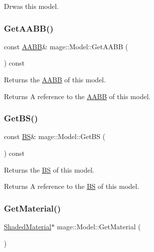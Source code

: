 Drwas this model. \hypertarget{classmage_1_1_model_a07af22d1e72ffde3ad33b709a8d5c7f4}{}\label{classmage_1_1_model_a07af22d1e72ffde3ad33b709a8d5c7f4} 
\subsubsection{\texorpdfstring{Get\+A\+A\+B\+B()}{GetAABB()}}
{\footnotesize\ttfamily const \hyperlink{structmage_1_1_a_a_b_b}{A\+A\+BB}\& mage\+::\+Model\+::\+Get\+A\+A\+BB (\begin{DoxyParamCaption}{ }\end{DoxyParamCaption}) const\hspace{0.3cm}{\ttfamily [noexcept]}}

Returns the \hyperlink{structmage_1_1_a_a_b_b}{A\+A\+BB} of this model.

\begin{DoxyReturn}{Returns}
A reference to the \hyperlink{structmage_1_1_a_a_b_b}{A\+A\+BB} of this model. 
\end{DoxyReturn}
\hypertarget{classmage_1_1_model_a7d99f18fd9cd6902795f77995b87bea2}{}\label{classmage_1_1_model_a7d99f18fd9cd6902795f77995b87bea2} 
\subsubsection{\texorpdfstring{Get\+B\+S()}{GetBS()}}
{\footnotesize\ttfamily const \hyperlink{structmage_1_1_b_s}{BS}\& mage\+::\+Model\+::\+Get\+BS (\begin{DoxyParamCaption}{ }\end{DoxyParamCaption}) const\hspace{0.3cm}{\ttfamily [noexcept]}}

Returns the \hyperlink{structmage_1_1_b_s}{BS} of this model.

\begin{DoxyReturn}{Returns}
A reference to the \hyperlink{structmage_1_1_b_s}{BS} of this model. 
\end{DoxyReturn}
\hypertarget{classmage_1_1_model_aed33390bd172e034a76fa68093990174}{}\label{classmage_1_1_model_aed33390bd172e034a76fa68093990174} 
\subsubsection{\texorpdfstring{Get\+Material()}{GetMaterial()}\hspace{0.1cm}{\footnotesize\ttfamily [1/2]}}
{\footnotesize\ttfamily \hyperlink{structmage_1_1_shaded_material}{Shaded\+Material}$\ast$ mage\+::\+Model\+::\+Get\+Material (\begin{DoxyParamCaption}{ }\end{DoxyParamCaption})\hspace{0.3cm}{\ttfamily [noexcept]}}

